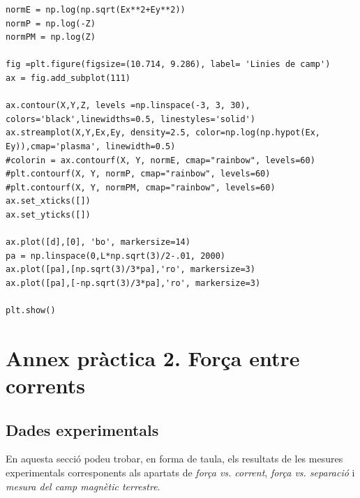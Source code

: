 \documentclass[a4paper,10.5pt]{report}
\begin{document}
\begin{appendices}
\begin{lstlisting}
normE = np.log(np.sqrt(Ex**2+Ey**2))
normP = np.log(-Z)
normPM = np.log(Z)

fig =plt.figure(figsize=(10.714, 9.286), label= 'Linies de camp') 
ax = fig.add_subplot(111)

ax.contour(X,Y,Z, levels =np.linspace(-3, 3, 30), colors='black',linewidths=0.5, linestyles='solid')
ax.streamplot(X,Y,Ex,Ey, density=2.5, color=np.log(np.hypot(Ex, Ey)),cmap='plasma', linewidth=0.5)
#colorin = ax.contourf(X, Y, normE, cmap="rainbow", levels=60)
#plt.contourf(X, Y, normP, cmap="rainbow", levels=60)
#plt.contourf(X, Y, normPM, cmap="rainbow", levels=60)
ax.set_xticks([])
ax.set_yticks([])

ax.plot([d],[0], 'bo', markersize=14)
pa = np.linspace(0,L*np.sqrt(3)/2-.01, 2000)
ax.plot([pa],[np.sqrt(3)/3*pa],'ro', markersize=3)
ax.plot([pa],[-np.sqrt(3)/3*pa],'ro', markersize=3)

plt.show()
\end{lstlisting}

\newpage
\section{Annex pràctica 2. Força entre corrents}
\subsection{Dades experimentals}
En aquesta secció podeu trobar, en forma de taula, els resultats de les mesures experimentals corresponents als apartats de \textit{força vs. corrent}, \textit{força vs. separació} i \textit{mesura del camp magnètic terrestre}.


\end{appendices}
\end{document}
